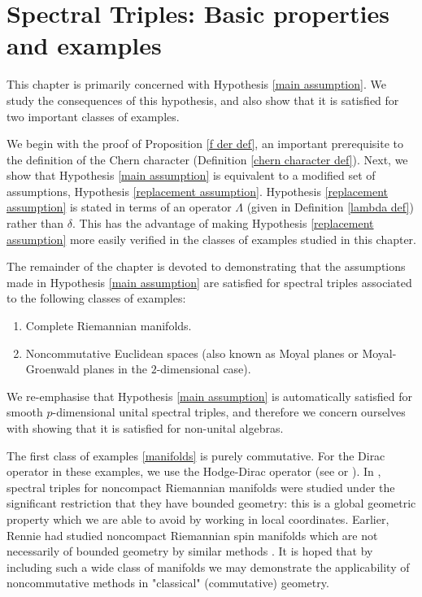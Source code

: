\chapter{Spectral Triples: Basic properties and examples}\label{examples chapter}
    
    This chapter is primarily concerned with Hypothesis \ref{main assumption}. We study the consequences of this hypothesis, and also show that it
    is satisfied for two important classes of examples.
    
    We begin with the proof of Proposition \ref{f der def}, an important prerequisite to the definition
    of the Chern character (Definition \ref{chern character def}).     
    Next, we show that Hypothesis \ref{main assumption} is equivalent to a modified set of assumptions, Hypothesis \ref{replacement assumption}.
    { Hypothesis \ref{replacement assumption} is stated in terms of an operator $\Lambda$ (given in Definition \ref{lambda def}) rather than $\delta$. This has
    the advantage of making Hypothesis \ref{replacement assumption} more easily verified in the classes of examples studied in this chapter.}
    
    The remainder of the chapter is devoted to demonstrating that the assumptions made in Hypothesis \ref{main assumption} are satisfied for spectral triples associated to the following classes of examples:
    \begin{enumerate}[{\rm (a)}]
        \item{}\label{manifolds} Complete Riemannian manifolds.
        \item{}\label{moyal planes} Noncommutative Euclidean spaces (also known as Moyal planes or Moyal-Groenwald planes in the $2$-dimensional case).
    \end{enumerate}
    
    We re-emphasise that Hypothesis \ref{main assumption} is automatically satisfied for smooth $p$-dimensional unital spectral triples, and therefore 
    we concern ourselves with showing that it is satisfied for non-unital algebras.
    
    The first class of examples \eqref{manifolds} is purely commutative. For the Dirac operator in these examples, we use the Hodge-Dirac operator (see \cite{krym} or \cite{rosenberg}).
    In \cite{CGRS2}, spectral triples for noncompact Riemannian manifolds were studied under the significant restriction that they have bounded geometry: this is a global
    geometric property which we are able to avoid by working in local coordinates. Earlier, Rennie had studied noncompact Riemannian spin manifolds which are not necessarily of bounded geometry by similar methods \cite[Section 5]{Rennie-2004}. It is hoped that by including such a wide class of manifolds we may demonstrate the applicability of noncommutative methods in "classical" (commutative) geometry.
    

